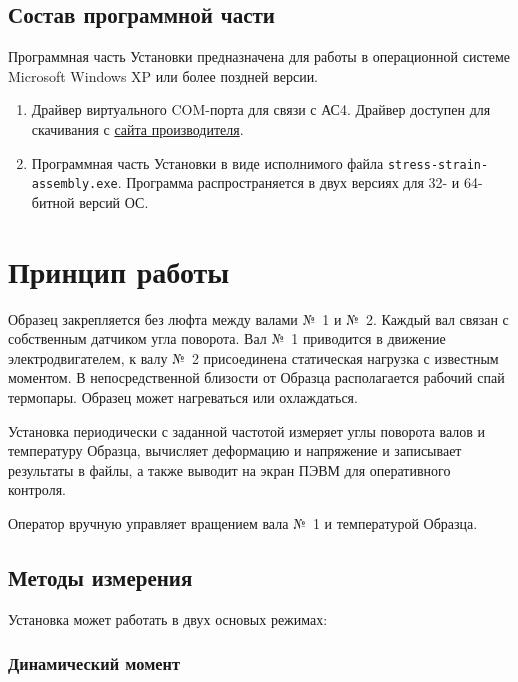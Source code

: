 \documentclass[12pt, a4paper, twocolumn]{report}
\begin{document}
\subsection{Состав программной части}
\label{sec_software}

Программная часть Установки предназначена для работы в операционной системе Microsoft Windows XP или более поздней версии.

\begin{enumerate}

\item Драйвер виртуального COM-порта для связи с АС4. Драйвер доступен для скачивания с \href{http://www.owen.ru/catalog/avtomaticheskij_preobrazovatel_interfejsov_usb_rs_485_owen_as4/opisanie}{сайта производителя}.

\item Программная часть Установки в виде исполнимого файла {\tt stress-strain-assembly.exe}. Программа распространяется в двух версиях для 32- и 64-битной версий ОС.

\end{enumerate}

\section{Принцип работы}

Образец закрепляется без люфта между валами №~1 и №~2. Каждый вал связан с собственным датчиком угла поворота. Вал №~1 приводится в движение электродвигателем, к валу №~2 присоединена статическая нагрузка с известным моментом. В непосредственной близости от Образца располагается рабочий спай термопары. Образец может нагреваться или охлаждаться.

Установка периодически с заданной частотой измеряет углы поворота валов и температуру Образца, вычисляет деформацию и напряжение и записывает результаты в файлы, а также выводит на экран ПЭВМ для оперативного контроля.

Оператор вручную управляет вращением вала №~1 и температурой Образца.

\subsection{Методы измерения}
\label{sec_measurement_method}

Установка может работать в двух основых режимах:

\subsubsection{Динамический момент}
\end{document}
